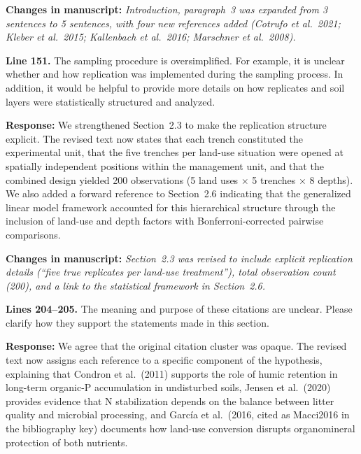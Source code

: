 \documentclass[11pt,a4paper]{article}
\newcommand{\response}[1]{\par\noindent\textcolor{responsecolor}{\textbf{Response:}} #1}
\newcommand{\change}[1]{\par\noindent\textcolor{changecolor}{\textbf{Changes in manuscript:}} \textit{#1}}
\begin{document}
\change{Introduction, paragraph~3 was expanded from 3 sentences to 5 sentences, with four new references added (Cotrufo et al.\ 2021; Kleber et al.\ 2015; Kallenbach et al.\ 2016; Marschner et al.\ 2008).}

\bigskip


\begin{reviewerbox}
\textbf{Line 151.} The sampling procedure is oversimplified. For example, it is unclear whether and how replication was implemented during the sampling process. In addition, it would be helpful to provide more details on how replicates and soil layers were statistically structured and analyzed.
\end{reviewerbox}

\response{We strengthened Section~2.3 to make the replication structure explicit. The revised text now states that each trench constituted the experimental unit, that the five trenches per land-use situation were opened at spatially independent positions within the management unit, and that the combined design yielded 200 observations (5 land uses $\times$ 5 trenches $\times$ 8 depths). We also added a forward reference to Section~2.6 indicating that the generalized linear model framework accounted for this hierarchical structure through the inclusion of land-use and depth factors with Bonferroni-corrected pairwise comparisons.}

\change{Section~2.3 was revised to include explicit replication details (``five true replicates per land-use treatment''), total observation count (200), and a link to the statistical framework in Section~2.6.}

\bigskip


\begin{reviewerbox}
\textbf{Lines 204--205.} The meaning and purpose of these citations are unclear. Please clarify how they support the statements made in this section.
\end{reviewerbox}

\response{We agree that the original citation cluster was opaque. The revised text now assigns each reference to a specific component of the hypothesis, explaining that Condron et al.\ (2011) supports the role of humic retention in long-term organic-P accumulation in undisturbed soils, Jensen et al.\ (2020) provides evidence that N stabilization depends on the balance between litter quality and microbial processing, and Garc\'{i}a et al.\ (2016, cited as Macci2016 in the bibliography key) documents how land-use conversion disrupts organomineral protection of both nutrients.}
\end{document}
